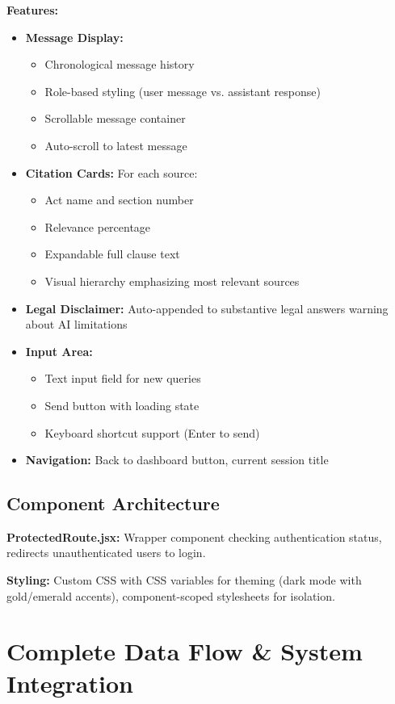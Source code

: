 \documentclass[12pt,a4paper]{article}
\begin{document}
\textbf{Features:}
\begin{itemize}
    \item \textbf{Message Display:}
    \begin{itemize}
        \item Chronological message history
        \item Role-based styling (user message vs. assistant response)
        \item Scrollable message container
        \item Auto-scroll to latest message
    \end{itemize}
    \item \textbf{Citation Cards:} For each source:
    \begin{itemize}
        \item Act name and section number
        \item Relevance percentage
        \item Expandable full clause text
        \item Visual hierarchy emphasizing most relevant sources
    \end{itemize}
    \item \textbf{Legal Disclaimer:} Auto-appended to substantive legal answers warning about AI limitations
    \item \textbf{Input Area:}
    \begin{itemize}
        \item Text input field for new queries
        \item Send button with loading state
        \item Keyboard shortcut support (Enter to send)
    \end{itemize}
    \item \textbf{Navigation:} Back to dashboard button, current session title
\end{itemize}

\subsection{Component Architecture}

\textbf{ProtectedRoute.jsx:} Wrapper component checking authentication status, redirects unauthenticated users to login.

\textbf{Styling:} Custom CSS with CSS variables for theming (dark mode with gold/emerald accents), component-scoped stylesheets for isolation.

\section{Complete Data Flow \& System Integration}
\end{document}
